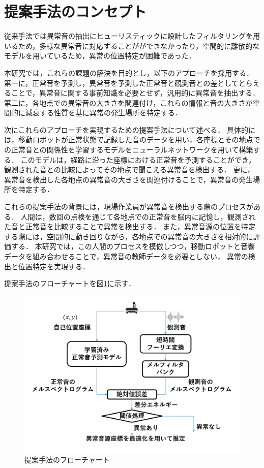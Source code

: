 \documentclass[../main]{subfiles}
\begin{document}
\section{提案手法のコンセプト}
\label{sec:pmethod_concept}
従来手法では異常音の抽出にヒューリスティックに設計したフィルタリングを用いるため，多様な異常音に対応することがができなかったり，空間的に離散的なモデルを用いているため，異常の位置特定が困難であった．

本研究では，これらの課題の解決を目的とし，以下のアプローチを採用する．
第一に，正常音を予測し，異常音を予測した正常音と観測音との差としてとらえることで，異常音に関する事前知識を必要とせず，汎用的に異常音を抽出する．
第二に，各地点での異常音の大きさを関連付け，これらの情報と音の大きさが空間的に減衰する性質を基に異常の発生場所を特定する．


次にこれらのアプローチを実現するための提案手法について述べる．
具体的には，移動ロボットが正常状態で記録した音のデータを用い，各座標とその地点での正常音との関係性を学習するモデルをニューラルネットワークを用いて構築する．
このモデルは，経路に沿った座標における正常音を予測することができ，観測された音との比較によってその地点で聞こえる異常音を検出する．
更に，異常音を検出した各地点の異常音の大きさを関連付けることで，異常音の発生場所を特定する．

これらの提案手法の背景には，現場作業員が異常音を検出する際のプロセスがある．
人間は，数回の点検を通じて各地点での正常音を脳内に記憶し，観測された音と正常音を比較することで異常を検出する．
また，異常音源の位置を特定する際には，空間的に動き回りながら，各地点での異常音の大きさを相対的に評価する．
本研究では，この人間のプロセスを模倣しつつ，移動ロボットと音響データを組み合わせることで，異常音の教師データを必要としない，
異常の検出と位置特定を実現する．

提案手法のフローチャートを図\ref{fig:flowchart}に示す．


\begin{figure}[t]
  \centering
  \includegraphics[keepaspectratio, width=1.0\linewidth]{chap3/flowchart_proposed_method.png}
  \caption{提案手法のフローチャート}
  \label{fig:flowchart}
\end{figure}
\end{document}
